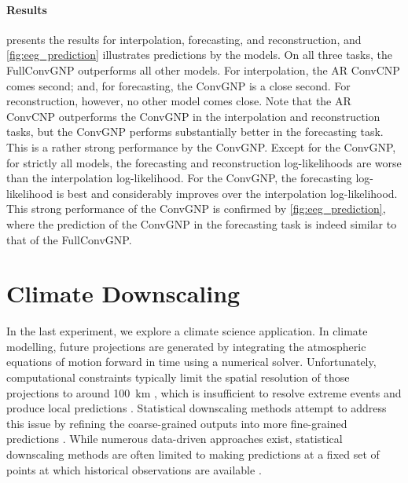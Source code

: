 \documentclass[12pt, twoside]{report}
\begin{document}
\paragraph{Results}
 presents the results for interpolation, forecasting, and reconstruction,
and \cref{fig:eeg_prediction} illustrates predictions by the models.
On all three tasks, the FullConvGNP outperforms all other models.
For interpolation, the AR ConvCNP comes second;
and, for forecasting, the ConvGNP is a close second.
For reconstruction, however, no other model comes close.
Note that the AR ConvCNP outperforms the ConvGNP in the interpolation and reconstruction tasks,
but the ConvGNP performs substantially better in the forecasting task.
This is a rather strong performance by the ConvGNP.
Except for the ConvGNP, for strictly all models, the forecasting and reconstruction log-likelihoods are worse than the interpolation log-likelihood.
For the ConvGNP, the forecasting log-likelihood is best and considerably improves over the interpolation log-likelihood.
This strong performance of the ConvGNP is confirmed by \cref{fig:eeg_prediction}, where the prediction of the ConvGNP in the forecasting task is indeed similar to that of the FullConvGNP.

\section{Climate Downscaling}
\label{sec:experiments:climate}

In the last experiment, we explore a climate science application.
In climate modelling, future projections are generated by integrating the atmospheric equations of motion forward in time using a numerical solver.
Unfortunately, computational constraints typically limit the spatial resolution of those projections to around \SI{100}{km} \parencite{Eyring:2016:Overview_of_the_Coupled_Model},
which is insufficient to resolve extreme events and produce local predictions \parencite{Stocker:2013:Climate_Change_2013,Maraun:2017:Towards_Process-Informed_Bias_Correction_of}.
Statistical downscaling methods attempt to address this issue by refining the coarse-grained outputs
into more fine-grained predictions
\parencite{Maraun:2018:Statistical_Downscaling_and_Bias_Correction}.
While numerous data-driven approaches exist,
statistical downscaling methods are often limited to making predictions at a fixed set of points at which historical observations are available 
\parencite{
Vandal:2017:DeepSD_Generating_High_Resolution_Climate,
Bhardwaj:2018:Downscaling_Future_Climate_Change_Projections,
Misra:2018:Statistical_Downscaling_of_Precipitation_Using,
Sachindra:2018:Statistical_Downscaling_of_Precipitation_Using,
Vandal:2018:Quantifying_Uncertainty_in_Discrete-Continuous_and,
Vandal:2019:Intercomparison_of_Machine_Learning_Methods,
Pan:2019:Improving_Precipitation_Estimation_Using_Convolutional,
Singh:2019:Downscaling_Numerical_Weather_Models_with_GANs,
Bano-Medina:2020:Configuration_and_Intercomparison_of_Deep,
Liu:2020:Climate_Downscaling_Using_YNet_A}.
\end{document}
